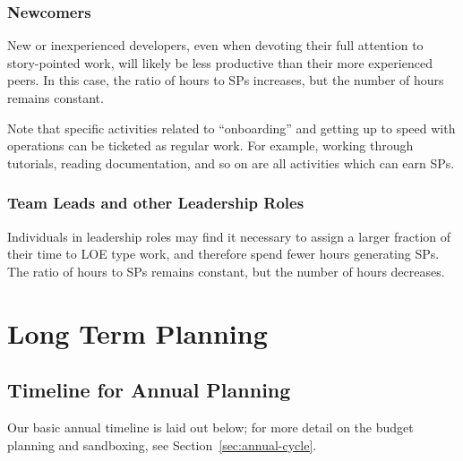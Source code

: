 \subsubsection{Newcomers}
\label{sec:newcomers}

New or inexperienced developers, even when devoting their full attention to \gls{story}-pointed work, will likely be less productive than their more experienced peers.
In this case, the ratio of hours to \glspl{SP} increases, but the number of hours remains constant.

Note that specific activities related to ``onboarding'' and getting up to speed with operations can be ticketed as regular work.
For example, working through tutorials, reading documentation, and so on are all activities which can earn \glspl{SP}.

\subsubsection{Team Leads and other Leadership Roles}

Individuals in leadership roles may find it necessary to assign a larger fraction of their time to \gls{LOE} type work, and therefore spend fewer hours generating \glspl{SP}.
The ratio of hours to \glspl{SP} remains constant, but the number of hours decreases.

\section{Long Term Planning}
\label{sec:long-term-plan}

\subsection{Timeline for Annual Planning}
\label{sec:annual-planning-timeline}

Our basic annual timeline is laid out below; for more detail on the budget planning and sandboxing, see Section~\ref{sec:annual-cycle}.

